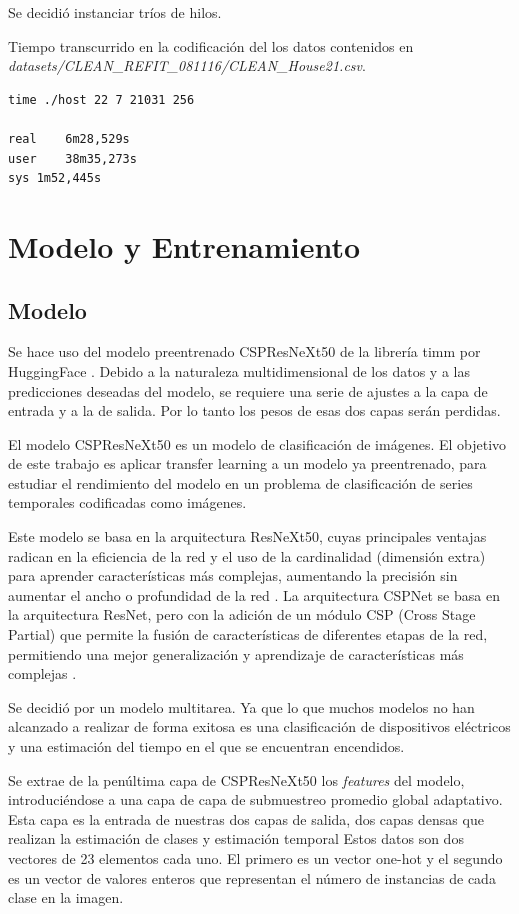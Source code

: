 Se decidió instanciar tríos de hilos. 

Tiempo transcurrido en la codificación del los datos contenidos en \\ \textit{datasets/CLEAN\_REFIT\_081116/CLEAN\_House21.csv}.
\begin{lstlisting}
time ./host 22 7 21031 256

real	6m28,529s
user	38m35,273s
sys	1m52,445s
\end{lstlisting}


\section{Modelo y Entrenamiento}
\subsection{Modelo}
Se hace uso del modelo preentrenado CSPResNeXt50 de la librería timm por HuggingFace \autocite{crunchbase2023huggingface}.
Debido a la naturaleza multidimensional de los datos y a las predicciones deseadas del modelo, se requiere una serie de ajustes a la capa de entrada y a la de salida. Por lo tanto los pesos de esas dos capas serán perdidas.

El modelo CSPResNeXt50 es un modelo de clasificación de imágenes. El objetivo de este trabajo es aplicar transfer learning a un modelo ya preentrenado, para estudiar el rendimiento del modelo en un problema de clasificación de series temporales codificadas como imágenes.

Este modelo se basa en la arquitectura ResNeXt50, cuyas principales ventajas radican en la eficiencia de la red y el uso de la cardinalidad (dimensión extra) para aprender características más complejas, aumentando la precisión sin aumentar el ancho o profundidad de la red \autocite{xie2017aggregated}.
La arquitectura CSPNet se basa en la arquitectura ResNet, pero con la adición de un módulo CSP (Cross Stage Partial) que permite la fusión de características de diferentes etapas de la red, permitiendo una mejor generalización y aprendizaje de características más complejas \autocite{wang2019cspnet}.

Se decidió por un modelo multitarea. Ya que lo que muchos modelos no han alcanzado a realizar de forma exitosa es una clasificación de dispositivos eléctricos y una estimación del tiempo en el que se encuentran encendidos.

Se extrae de la penúltima capa de CSPResNeXt50 los \textit{features} del modelo, introduciéndose a una capa de capa de submuestreo promedio global adaptativo. Esta capa es la entrada de nuestras dos capas de salida, dos capas densas que realizan la estimación de clases y estimación temporal
Estos datos son dos vectores de 23 elementos cada uno. El primero es un vector one-hot y el segundo es un vector de valores enteros que representan el número de instancias de cada clase en la imagen.





